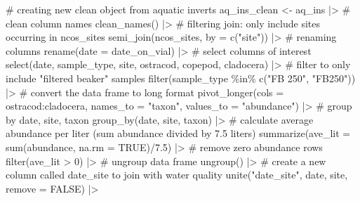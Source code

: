 \documentclass[
  letterpaper,
  DIV=11,
  numbers=noendperiod]{scrartcl}
\newenvironment{Shaded}{\begin{snugshade}}{\end{snugshade}}
\newcommand{\AttributeTok}[1]{\textcolor[rgb]{0.40,0.45,0.13}{#1}}
\newcommand{\CommentTok}[1]{\textcolor[rgb]{0.37,0.37,0.37}{#1}}
\newcommand{\ConstantTok}[1]{\textcolor[rgb]{0.56,0.35,0.01}{#1}}
\newcommand{\DecValTok}[1]{\textcolor[rgb]{0.68,0.00,0.00}{#1}}
\newcommand{\FloatTok}[1]{\textcolor[rgb]{0.68,0.00,0.00}{#1}}
\newcommand{\FunctionTok}[1]{\textcolor[rgb]{0.28,0.35,0.67}{#1}}
\newcommand{\NormalTok}[1]{\textcolor[rgb]{0.00,0.23,0.31}{#1}}
\newcommand{\OtherTok}[1]{\textcolor[rgb]{0.00,0.23,0.31}{#1}}
\newcommand{\SpecialCharTok}[1]{\textcolor[rgb]{0.37,0.37,0.37}{#1}}
\newcommand{\StringTok}[1]{\textcolor[rgb]{0.13,0.47,0.30}{#1}}
\begin{document}
\begin{Shaded}
\begin{Highlighting}[]
\CommentTok{\# creating new clean object from aquatic inverts}
\NormalTok{aq\_ins\_clean }\OtherTok{\textless{}{-}}\NormalTok{ aq\_ins }\SpecialCharTok{|\textgreater{}} 
  \CommentTok{\# clean column names}
  \FunctionTok{clean\_names}\NormalTok{() }\SpecialCharTok{|\textgreater{}} 
  \CommentTok{\# filtering join: only include sites occurring in ncos\_sites}
  \FunctionTok{semi\_join}\NormalTok{(ncos\_sites, }\AttributeTok{by =} \FunctionTok{c}\NormalTok{(}\StringTok{"site"}\NormalTok{)) }\SpecialCharTok{|\textgreater{}} 
  \CommentTok{\# renaming columns}
  \FunctionTok{rename}\NormalTok{(}\AttributeTok{date =}\NormalTok{ date\_on\_vial) }\SpecialCharTok{|\textgreater{}} 
  \CommentTok{\# select columns of interest}
  \FunctionTok{select}\NormalTok{(date, sample\_type, site,}
\NormalTok{         ostracod,}
\NormalTok{         copepod,}
\NormalTok{         cladocera) }\SpecialCharTok{|\textgreater{}} 
  \CommentTok{\# filter to only include "filtered beaker" samples}
  \FunctionTok{filter}\NormalTok{(sample\_type }\SpecialCharTok{\%in\%} \FunctionTok{c}\NormalTok{(}\StringTok{"FB 250"}\NormalTok{, }\StringTok{"FB250"}\NormalTok{)) }\SpecialCharTok{|\textgreater{}} 
  \CommentTok{\# convert the data frame to long format}
  \FunctionTok{pivot\_longer}\NormalTok{(}\AttributeTok{cols =}\NormalTok{ ostracod}\SpecialCharTok{:}\NormalTok{cladocera,}
               \AttributeTok{names\_to =} \StringTok{"taxon"}\NormalTok{,}
               \AttributeTok{values\_to =} \StringTok{"abundance"}\NormalTok{) }\SpecialCharTok{|\textgreater{}} 
  \CommentTok{\# group by date, site, taxon}
  \FunctionTok{group\_by}\NormalTok{(date, site, taxon) }\SpecialCharTok{|\textgreater{}} 
  \CommentTok{\# calculate average abundance per liter (sum abundance divided by 7.5 liters)}
  \FunctionTok{summarize}\NormalTok{(}\AttributeTok{ave\_lit =} \FunctionTok{sum}\NormalTok{(abundance, }\AttributeTok{na.rm =} \ConstantTok{TRUE}\NormalTok{)}\SpecialCharTok{/}\FloatTok{7.5}\NormalTok{) }\SpecialCharTok{|\textgreater{}}
  \CommentTok{\# remove zero abundance rows}
  \FunctionTok{filter}\NormalTok{(ave\_lit }\SpecialCharTok{\textgreater{}} \DecValTok{0}\NormalTok{) }\SpecialCharTok{|\textgreater{}}
  \CommentTok{\# ungroup data frame}
  \FunctionTok{ungroup}\NormalTok{() }\SpecialCharTok{|\textgreater{}} 
  \CommentTok{\# create a new column called \textasciigrave{}date\_site\textasciigrave{} to join with water quality}
  \FunctionTok{unite}\NormalTok{(}\StringTok{"date\_site"}\NormalTok{, date, site, }\AttributeTok{remove =} \ConstantTok{FALSE}\NormalTok{) }\SpecialCharTok{|\textgreater{}} 

\end{Highlighting}
\end{Shaded}
\end{document}
